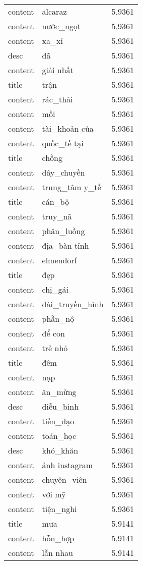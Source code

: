 \documentclass{article}
\begin{document}
\begin{tabular}{lll}
content & alcaraz & 5.9361\\
content & nước\_ngọt & 5.9361\\
content & xa\_xỉ & 5.9361\\
desc & đã & 5.9361\\
content & giải nhất & 5.9361\\
title & trận & 5.9361\\
content & rác\_thải & 5.9361\\
content & mồi & 5.9361\\
content & tài\_khoản của & 5.9361\\
content & quốc\_tế tại & 5.9361\\
title & chồng & 5.9361\\
content & dây\_chuyền & 5.9361\\
content & trung\_tâm y\_tế & 5.9361\\
title & cán\_bộ & 5.9361\\
content & truy\_nã & 5.9361\\
content & phân\_luồng & 5.9361\\
content & địa\_bàn tỉnh & 5.9361\\
content & elmendorf & 5.9361\\
title & đẹp & 5.9361\\
content & chị\_gái & 5.9361\\
content & đài\_truyền\_hình & 5.9361\\
content & phẫn\_nộ & 5.9361\\
content & để con & 5.9361\\
content & trẻ nhỏ & 5.9361\\
title & đêm & 5.9361\\
content & nạp & 5.9361\\
content & ăn\_mừng & 5.9361\\
desc & diễu\_binh & 5.9361\\
content & tiền\_đạo & 5.9361\\
content & toán\_học & 5.9361\\
desc & khó\_khăn & 5.9361\\
content & ảnh instagram & 5.9361\\
content & chuyên\_viên & 5.9361\\
content & với mỹ & 5.9361\\
content & tiện\_nghi & 5.9361\\
title & mưa & 5.9141\\
content & hỗn\_hợp & 5.9141\\
content & lẫn nhau & 5.9141\\

\end{tabular}
\end{document}
